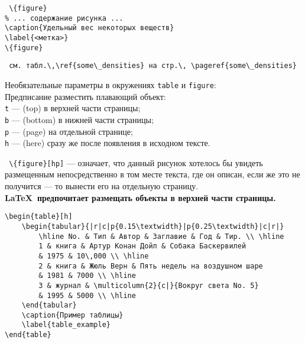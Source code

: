 \noindent
\texttt{
\textbackslash \{figure\}\\
\phantom{~~~~}\% ... содержание рисунка ...\\
\phantom{~~~~}\textbackslash caption\{Удельный вес некоторых веществ\}\\
\phantom{~~~~}\textbackslash label\{<метка>\}\\
\textbackslash \{figure\}}\\
\medskip

\noindent
\texttt{
см.~табл.\textbackslash ,\textbackslash ref\{some\textbackslash \_densities\} на стр.\textbackslash , \textbackslash pageref\{some\textbackslash \_densities\}}\\
\medskip

\noindent
Необязательные параметры в окружениях \texttt{table} и \texttt{figure}:\\
Предписание разместить плавающий объект:\\
\texttt{t} --- (top) в верхней части страницы;\\
\texttt{b} --- (bottom) в нижней части страницы;\\
\texttt{p} --- (page) на отдельной странице;\\
\texttt{h} --- (here) сразу же после появления в исходном тексте.\\
\medskip

\noindent
\texttt{
\textbackslash \{figure\}[hp]} --- означает, что данный рисунок хотелось бы увидеть размещенным непосредственно в том месте текста, где он описан, если же это не получится --- то вынести его на отдельную страницу.\\
\textbf{
\LaTeX \ предпочитает размещать объекты в верхней части страницы.}

\noindent
\begin{verbatim}
\begin{table}[h]
    \begin{tabular}{|r|c|p{0.15\textwidth}|p{0.25\textwidth}|c|r|}
        \hline No. & Тип & Автор & Заглавие & Год & Тир. \\ \hline
        1 & книга & Артур Конан Дойл & Собака Баскервилей
        & 1975 & 10\,000 \\ \hline
        2 & книга & Жюль Верн & Пять недель на воздушном шаре
        & 1981 & 7000 \\ \hline
        3 & журнал & \multicolumn{2}{c|}{Вокруг света No. 5}
        & 1995 & 5000 \\ \hline
    \end{tabular}
    \caption{Пример таблицы}
    \label{table_example}
\end{table}
\end{verbatim}

